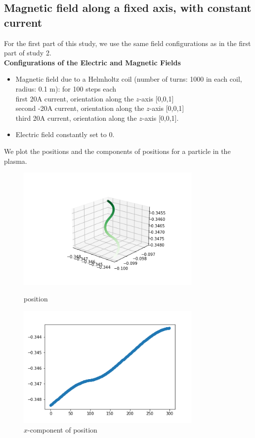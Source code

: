 \documentclass[12pt]{article}
\begin{document}
	\subsection{Magnetic field along a fixed axis, with constant current}
	For the first part of this study, we use the same field configurations as in the first part of study 2.\\
	\noindent \textbf{Configurations of the Electric and Magnetic Fields}
	\begin{itemize}
		\item Magnetic field due to a Helmholtz coil (number of turns: 1000 in each coil, radius: 0.1 m): for 100  steps each \\ 
		first 20A current, orientation along
		the $z$-axis [0,0,1] \\
		second -20A current, orientation along
		the $z$-axis [0,0,1] \\
		third 20A current, orientation along
		the $z$-axis [0,0,1].
		\item Electric field constantly set to 0.
	\end{itemize}
	\noindent We plot the positions and the components of positions for a particle in the plasma.
	\begin{figure}[H]
		\begin{multicols}{2}
			\includegraphics[width=\linewidth, height=6cm]{ps3Bz.png} \caption{position} \label{ps3Bz} \par
			\includegraphics[width=\linewidth, height=6cm]{psx3Bz.png} \caption{$x$-component of position} \label{psx3Bz} \par
		\end{multicols}
	\end{figure}
\end{document}
